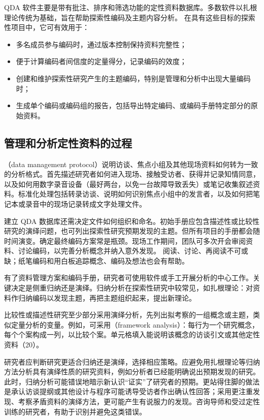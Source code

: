 QDA 软件主要是带有批注、排序和筛选功能的定性资料数据库。多数软件以扎根理论传统为基础，旨在帮助探索性编码及主题内容分析。
在具有这些目标的探索性项目中，它可有效用于：
\begin{itemize}
\item 多名成员参与编码时，通过版本控制保持资料完整性；
\item 便于计算编码者间信度的定量得分，记录编码的效度；
\item 创建和维护探索性研究产生的主题编码，特别是管理和分析中出现大量编码时；
\item 生成单个编码或编码组的报告，包括导出特定编码、或编码手册特定部分的原始资料。
\end{itemize}

\subsection{管理和分析定性资料的过程}
（data management protocol）说明访谈、焦点小组及其他现场资料如何转为一致的分析格式。首先描述研究者如何进入现场、接触受访者、获得并记录知情同意，以及如何用数字录音设备（最好两台，以免一台故障导致丢失）或笔记收集叙述资料。标准化处理包括转录访谈、说明如何识别焦点小组中的发言者，以及如何把笔记本或录音中的现场记录转成文字处理文件。

建立 QDA 数据库还需决定文件如何组织和命名。初始手册应包含描述性或比较性研究的演绎问题，也可列出探索性研究预期发现的主题。但所有项目的手册都会随时间演变。确定最终编码方案常是瓶颈。现场工作期间，团队可多次开会审阅资料、讨论编码，以完善分析概念并纳入意外发现。
阅读、讨论、再阅读不可或缺；纸笔编码和用白板追踪概念、编码及想法也会有帮助。

有了资料管理方案和编码手册，研究者可使用软件或手工开展分析的中心工作。关键决定是侧重归纳还是演绎。归纳分析在探索性研究中较常见，如扎根理论：对资料作归纳编码以发现主题，再把主题组织起来，提出新理论。

比较性或描述性研究至少部分采用演绎分析，先列出拟考察的一组概念或主题，类似定量分析的变量。例如，可采用（framework analysis）：每行为一个研究概念，每个个案构成一列，以比较个案。单元格填入能说明该概念的访谈引文或其他定性资料（20）。

研究者应判断研究更适合归纳还是演绎，选择相应策略。应避免用扎根理论等归纳方法分析具有演绎性质的研究资料，例如分析者已经能明确说出预期发现的研究。此时，归纳分析可能错误地暗示新认识“证实”了研究者的预期。更站得住脚的做法是承认访谈提纲或其他设计与程序可能诱导受访者作出确认性回答；采用更注重发现、考察矛盾资料的演绎方法，更可能产生有说服力的发现。咨询导师和受过定性训练的研究者，有助于识别并避免这类错误。

